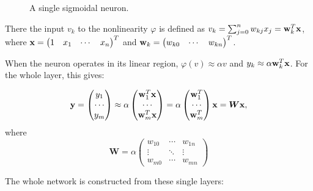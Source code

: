 \documentclass[10pt,a4]{article}
\newcommand{\vect}[1]{{\bf{#1}}}
\newcommand{\matr}[1]{\boldsymbol{#1}}
\begin{document}
\begin{enumerate}
  \begin{figure}[hb]
    \begin{center}
      
      \caption{\label{fig:singleneuron} A single sigmoidal neuron.}
    \end{center}
  \end{figure}
  
  There the input $v_k$ to the nonlinearity $\varphi$ is defined as
  $v_k = \sum_{j = 0}^n w_{kj}x_j = \vect{w}_k^T \vect{x}$, \newline
  where $\vect{x}=\begin{pmatrix} 1 & x_1 &\cdots & x_n
  \end{pmatrix}^T$ and $\vect{w}_k=\begin{pmatrix} w_{k0} &\cdots &
    w_{kn} \end{pmatrix}^T$.

  When the neuron operates in its linear region, $\varphi(v) \approx
  \alpha v$ and $y_k \approx \alpha \vect{w}_k^T \vect{x}$. For the
  whole layer, this gives: 

  \begin{equation}
    \vect{y} = \begin{pmatrix}  y_1 \\ \cdots \\ y_m \end{pmatrix}
    \approx \alpha \begin{pmatrix}  \vect{w}_1^T \vect{x}\\ \cdots \\
      \vect{w}_m^T \vect{x} \end{pmatrix} 
    = \alpha \begin{pmatrix}  \vect{w}_1^T\\ \cdots \\
      \vect{w}_m^T \end{pmatrix} \vect{x} = \matr{W} \vect{x},
  \end{equation}
  where
  \begin{equation}
    \matr{W} = \alpha \begin{pmatrix}
      w_{10} & \cdots & w_{1n} \\ \vdots & \ddots & \vdots \\
      w_{m0} & \cdots & w_{mn} 
    \end{pmatrix}
  \end{equation}
  
  The whole network is constructed from these single layers:


\end{enumerate}
\end{document}
